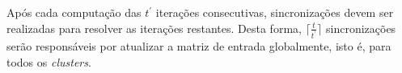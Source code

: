 %




%

Após cada computação das $t^\prime$ iterações consecutivas,
sincronizações devem ser realizadas para resolver as iterações restantes. Desta
forma, $\lceil\frac{t}{t^\prime}\rceil$ sincronizações serão responsáveis por
atualizar a matriz de entrada globalmente, isto é, para todos os
\textit{clusters}.



